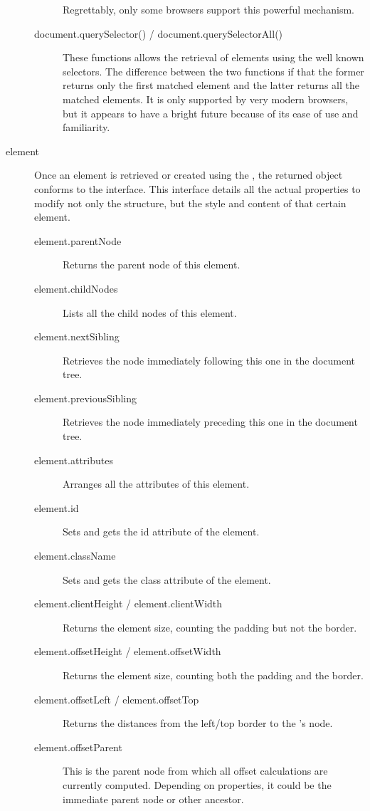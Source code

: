 \begin{description}
\begin{description}
    Regrettably, only some browsers support this powerful mechanism.
    \item[document.querySelector() / document.querySelectorAll()] These functions allows the retrieval of elements using the well known  selectors.
    The difference between the two functions if that the former returns only the first matched element and the latter returns all the matched elements.
    It is only supported by very modern browsers, but it appears to have a bright future because of its ease of use and familiarity.
  \end{description}
  \item[element] Once an element is retrieved or created using the , the returned object conforms to the  interface.
  This interface details all the actual properties to modify not only the  structure, but the style and content of that certain element.
  \begin{description}
    \item[element.parentNode] Returns the parent node of this element.
    \item[element.childNodes] Lists all the child nodes of this element.
    \item[element.nextSibling] Retrieves the node immediately following this one in the document tree.
    \item[element.previousSibling] Retrieves the node immediately preceding this one in the document tree.
    \item[element.attributes] Arranges all the attributes of this element.
    \item[element.id] Sets and gets the id attribute of the element.
    \item[element.className] Sets and gets the class attribute of the element.
    \item[element.clientHeight / element.clientWidth] Returns the element size, counting the padding but not the border.
    \item[element.offsetHeight / element.offsetWidth] Returns the element size, counting both the padding and the border.
    \item[element.offsetLeft / element.offsetTop] Returns the distances from the left/top border to the 's node.
    \item[element.offsetParent] This is the parent node from which all offset calculations are currently computed.
    Depending on  properties, it could be the immediate parent node or other ancestor.

\end{description}
\end{description}
